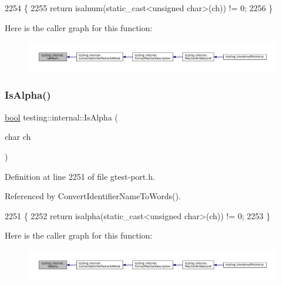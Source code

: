 \begin{DoxyCode}
2254                              \{
2255   \textcolor{keywordflow}{return} isalnum(static\_cast<unsigned char>(ch)) != 0;
2256 \}
\end{DoxyCode}
Here is the caller graph for this function\+:
\nopagebreak
\begin{figure}[H]
\begin{center}
\leavevmode
\includegraphics[width=350pt]{namespacetesting_1_1internal_a83802e7f23324cd512232203662e1a98_icgraph}
\end{center}
\end{figure}
\mbox{\label{namespacetesting_1_1internal_aeb957087fd6bbf9db98ab7cd41b0c129}} 
\subsubsection{\texorpdfstring{Is\+Alpha()}{IsAlpha()}}
{\footnotesize\ttfamily \hyperlink{classbool}{bool} testing\+::internal\+::\+Is\+Alpha (\begin{DoxyParamCaption}\item[{char}]{ch }\end{DoxyParamCaption})\hspace{0.3cm}{\ttfamily [inline]}}



Definition at line 2251 of file gtest-\/port.\+h.



Referenced by Convert\+Identifier\+Name\+To\+Words().


\begin{DoxyCode}
2251                              \{
2252   \textcolor{keywordflow}{return} isalpha(static\_cast<unsigned char>(ch)) != 0;
2253 \}
\end{DoxyCode}
Here is the caller graph for this function\+:
\nopagebreak
\begin{figure}[H]
\begin{center}
\leavevmode
\includegraphics[width=350pt]{namespacetesting_1_1internal_aeb957087fd6bbf9db98ab7cd41b0c129_icgraph}
\end{center}
\end{figure}
\mbox{\label{namespacetesting_1_1internal_acb6ea1086293c1d6636e3c67941351fb}} 
